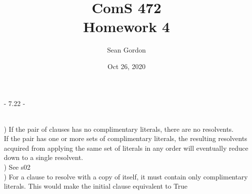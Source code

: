 \documentclass[12pt]{article}
\title{ComS 472\\Homework 4}
\author{Sean Gordon}
\date{Oct 26, 2020}
\begin{document}
\maketitle


\centerline{- 7.22 - }
\ \\
) If the pair of clauses has no complimentary literals, there are no resolvents. \checkmark\\[.4em]
\indent If the pair has one or more sets of complimentary literals, the resulting resolvents \\
\indent acquired from applying the same set of literals in any order will eventually reduce\\
\indent down to a single resolvent. \checkmark\\

) See s02\\[.4em]

) For a clause to resolve with a copy of itself, it must contain only complimentary \\[.4em]
\indent literals. This would make the initial clause equivalent to True\\[.4em]



\noindent \hrulefill \pagebreak
\end{document}
